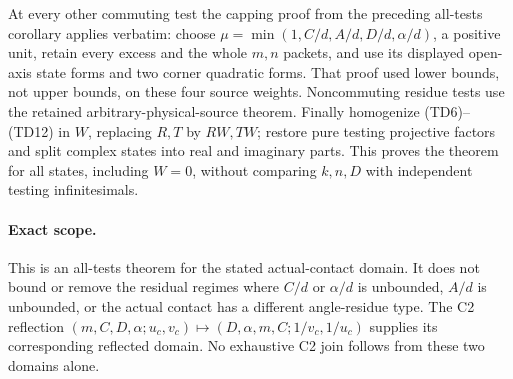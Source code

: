 At every other commuting test the capping proof from the preceding
all-tests corollary applies verbatim: choose
$\mu=\min(1,C/d,A/d,D/d,\alpha/d)$, a positive unit, retain every
excess and the whole $m,n$ packets, and use its displayed open-axis
state forms and two corner quadratic forms. That proof used lower
bounds, not upper bounds, on these four source weights. Noncommuting
residue tests use the retained arbitrary-physical-source theorem.
Finally homogenize (TD6)--(TD12) in $W$, replacing $R,T$ by $RW,TW$;
restore pure testing projective factors and split complex states into
real and imaginary parts. This proves the theorem for all states,
including $W=0$, without comparing $k,n,D$ with independent testing
infinitesimals.

\paragraph{Exact scope.}
This is an all-tests theorem for the stated actual-contact domain.
It does not bound or remove the residual regimes where $C/d$ or
$\alpha/d$ is unbounded, $A/d$ is unbounded, or the actual contact
has a different angle-residue type. The C2 reflection
$(m,C,D,\alpha;u_c,v_c)\mapsto(D,\alpha,m,C;1/v_c,1/u_c)$ supplies
its corresponding reflected domain. No exhaustive C2 join follows
from these two domains alone.
